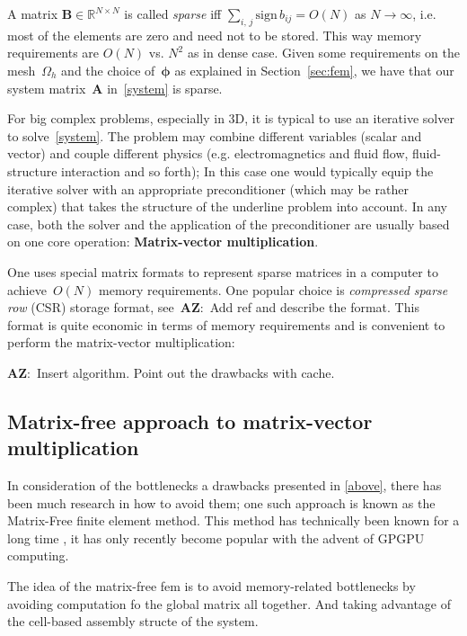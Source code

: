 \documentclass[12pt]{article}
\newcommand{\vect}[1]{\boldsymbol{\mathbf{#1}}}
\newcommand{\AZ}[1]{{\color{red}\textbf{AZ}:~#1}}
\newcommand{\dimSize}{N}
\begin{document}
A matrix $\vect B \in \mathbb R^{\dimSize\times\dimSize}$ is called \textit{sparse} iff $\sum_{i,\,j} \mbox{sign}\,b_{ij} = O(\dimSize)$ as $\dimSize \rightarrow \infty$, i.e. most of the elements are zero and need not to be stored. This way memory requirements are $O(\dimSize)$ vs. $\dimSize^2$ as in dense case. Given some requirements on the mesh~$\Omega_h$ and the choice of~$\vect\phi$ as explained in Section~\ref{sec:fem}, we have that our system matrix~$\vect A$ in~\eqref{system} is sparse.

For big complex problems, especially in 3D, it is typical to use an iterative solver to solve~\eqref{system}. The problem may combine different variables (scalar and vector) and couple different physics (e.g. electromagnetics and fluid flow, fluid-structure interaction and so forth); In this case one would typically equip the iterative solver with an appropriate preconditioner (which may be rather complex) that takes the structure of the underline problem into account. In any case, both the solver and the application of the preconditioner are usually based on one core operation: \textbf{Matrix-vector multiplication}.

One uses special matrix formats to represent sparse matrices in a computer to achieve~$O(\dimSize)$ memory requirements. One popular choice is \textit{compressed sparse row} (CSR) storage format, see~\AZ{Add ref and describe the format.} This format is quite economic in terms of memory requirements and is convenient to perform the matrix-vector multiplication:

\AZ{Insert algorithm. Point out the drawbacks with cache.}

\subsection{Matrix-free approach to matrix-vector multiplication}

In consideration of the bottlenecks a drawbacks presented in \ref{above}, there has been much research in how to avoid them; one such approach is known as the Matrix-Free finite element method. This method has technically been known for a long time \cite{first paper}, it has only recently become popular with the advent of GPGPU computing\cite{recent papers}. 

The idea of the matrix-free fem is to avoid memory-related bottlenecks by avoiding computation fo the global matrix all together. And taking advantage of the cell-based assembly structe of the system. 
\end{document}
